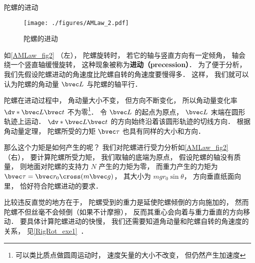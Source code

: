 \begin{example}{陀螺的进动}\label{AMLaw_ex2}
\begin{figure}[ht]
\centering
\texttt{[image: ./figures/AMLaw\_2.pdf]}
\caption{陀螺的进动}\label{AMLaw_fig2}
\end{figure}

如\autoref{AMLaw_fig2} （左）， 陀螺旋转时， 若它的轴与竖直方向有一定倾角， 轴会绕一个竖直轴缓慢旋转， 这种现象被称为\textbf{进动（precession）}． 为了便于分析， 我们先假设陀螺进动的角速度比陀螺自转的角速度要慢得多． 这样， 我们就可以认为陀螺的角动量 $\bvec L$ 与陀螺的轴平行．

陀螺在进动过程中， 角动量大小不变， 但方向不断变化， 所以角动量变化率 $\dv*{\bvec L}{\bvec t}$ 不为零\footnote{可以类比质点做圆周运动时， 速度矢量的大小不改变， 但仍然产生加速度}． 令 $\bvec L$ 的起点为原点， $\bvec L$ 末端在圆形轨迹上运动． $\dv*{\bvec L}{\bvec t}$ 的方向始终沿着该圆形轨迹的切线方向． 根据角动量定理， 陀螺所受的力矩 $\bvec \tau$ 也具有同样的大小和方向．

那么这个力矩是如何产生的呢？ 我们对陀螺进行受力分析如\autoref{AMLaw_fig2} （右）， 要计算陀螺所受力矩， 我们取轴的底端为原点， 假设陀螺的轴没有质量， 则地面对陀螺的支持力 $N$ 产生的力矩为零， 而重力产生的力矩为 $\bvec \tau = \bvec r_0 \cross (m\bvec g)$， 其大小为 $mgr_0\sin\theta$， 方向垂直纸面向里， 恰好符合陀螺进动的要求．

比较违反直觉的地方在于， 陀螺受到的重力是延使陀螺倾倒的方向施加的， 然而陀螺不但丝毫不会倾倒（如果不计摩擦）， 反而其重心会向着与重力垂直的方向移动． 要具体计算陀螺进动的快慢， 我们还需要知道角动量和陀螺自转的角速度的关系， 见\autoref{RigRot_exe1}~．
\end{example}


